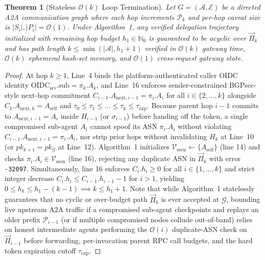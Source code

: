\documentclass[conference,10pt]{IEEEtran}
\newtheorem{theorem}{Theorem}
\begin{document}
\begin{theorem}[Stateless $\mathcal{O}(k)$ Loop Termination]
\label{thm:loop}
Let $G = (\mathcal{A}, \mathcal{E})$ be a directed A2A communication graph where each hop increments $\mathcal{P}_k$ and per-hop caveat size is $|S_i|, |P_i| = \mathcal{O}(1)$. Under Algorithm~1, any verified delegation trajectory initialized with remaining hop budget $h_1 \in \mathbb{N}_0$ is guaranteed to be acyclic over $\vec{\Pi}_k$ and has path length $k \le \min(|\mathcal{A}|, h_1 + 1)$ verified in $\mathcal{O}(k)$ gateway time, $\mathcal{O}(k)$ ephemeral hash-set memory, and $\mathcal{O}(1)$ cross-request gateway state.
\end{theorem}
\begin{proof}
At hop $k \ge 1$, Line~4 binds the platform-authenticated caller OIDC identity $\text{OIDC}_{\text{srv}}.\text{sub} = \pi_k.A_k$, and Line~16 enforces sender-constrained BGPsec-style next-hop commitment $C_{i-1}.A_{\text{next},i-1} = \pi_i.A_i$ for all $i \in \{2, \dots, k\}$ alongside $C_k.A_{\text{next},k} = A_{\text{self}}$ and $\tau_0 \le \tau_1 \le \dots \le \tau_k \le \tau_{\exp}$. Because parent hop $i-1$ commits to $A_{\text{next},i-1} = A_i$ inside $H_{i-1}$ (or $\sigma_{i-1}$) before handing off the token, a single compromised sub-agent $A_i$ cannot spoof its ASN $\pi_i.A_i$ without violating $C_{i-1}.A_{\text{next},i-1} = \pi_i.A_i$, nor strip prior hops without invalidating $H_k$ at Line~10 (or $pk_{k+1} = pk_{\mathcal{G}}$ at Line~12). Algorithm~1 initializes $\mathcal{V}_{\text{seen}} \leftarrow \{A_{\text{self}}\}$ (line 14) and checks $\pi_i.A_i \in \mathcal{V}_{\text{seen}}$ (line 16), rejecting any duplicate ASN in $\vec{\Pi}_k$ with error \texttt{-32097}. Simultaneously, line 16 enforces $C_i.h_i \ge 0$ for all $i \in \{1, \dots, k\}$ and strict integer decrease $C_i.h_i \le C_{i-1}.h_{i-1} - 1$ for $i > 1$, yielding $0 \le h_k \le h_1 - (k-1) \implies k \le h_1 + 1$. Note that while Algorithm~1 statelessly guarantees that no cyclic or over-budget path $\vec{\Pi}_k$ is ever accepted at $\mathcal{G}$, bounding live upstream A2A traffic if a compromised sub-agent checkpoints and replays an older prefix $\mathcal{P}_{i-1}$ (or if multiple compromised nodes collude out-of-band) relies on honest intermediate agents performing the $\mathcal{O}(i)$ duplicate-ASN check on $\vec{\Pi}_{i-1}$ before forwarding, per-invocation parent RPC call budgets, and the hard token expiration cutoff $\tau_{\exp}$.
\end{proof}
\end{document}
